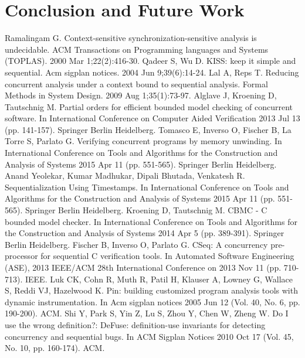 \documentclass{llncs}
\begin{document}
\section {Conclusion and Future Work}
\label{sect:conclusion}

\begin{thebibliography}{4}
%
Ramalingam G. Context-sensitive synchronization-sensitive analysis is undecidable. 
ACM Transactions on Programming languages and Systems (TOPLAS). 2000 Mar 1;22(2):416-30.
%
Qadeer S, Wu D. KISS: keep it simple and sequential. Acm sigplan notices. 2004 Jun 9;39(6):14-24.
%
Lal A, Reps T. Reducing concurrent analysis under a context bound to sequential analysis. 
Formal Methods in System Design. 2009 Aug 1;35(1):73-97.
%
Alglave J, Kroening D, Tautschnig M. 
Partial orders for efficient bounded model checking of concurrent software. 
In International Conference on Computer Aided Verification 2013 Jul 13 (pp. 141-157). 
Springer Berlin Heidelberg.
%
Tomasco E, Inverso O, Fischer B, La Torre S, Parlato G. 
Verifying concurrent programs by memory unwinding. 
In International Conference on Tools and Algorithms for the Construction and Analysis of 
Systems 2015 Apr 11 (pp. 551-565). Springer Berlin Heidelberg.
%
Anand Yeolekar, Kumar Madhukar, Dipali Bhutada, Venkatesh R.
Sequentialization Using Timestamps.
In International Conference on Tools and Algorithms for the Construction and Analysis of 
Systems 2015 Apr 11 (pp. 551-565). Springer Berlin Heidelberg.
%
Kroening D, Tautschnig M. 
CBMC - C bounded model checker. 
In International Conference on Tools and Algorithms for the Construction and Analysis of Systems 2014 Apr 5 (pp. 389-391). Springer Berlin Heidelberg.
%
Fischer B, Inverso O, Parlato G. 
CSeq: A concurrency pre-processor for sequential C verification tools. 
In Automated Software Engineering (ASE), 2013 IEEE/ACM 28th International Conference on 2013 Nov 11 (pp. 710-713). IEEE.
%
Luk CK, Cohn R, Muth R, Patil H, Klauser A, Lowney G, Wallace S, Reddi VJ, Hazelwood K. 
Pin: building customized program analysis tools with dynamic instrumentation. 
In Acm sigplan notices 2005 Jun 12 (Vol. 40, No. 6, pp. 190-200). ACM.
%
Shi Y, Park S, Yin Z, Lu S, Zhou Y, Chen W, Zheng W. 
Do I use the wrong definition?: DeFuse: definition-use invariants for detecting concurrency and sequential bugs. 
In ACM Sigplan Notices 2010 Oct 17 (Vol. 45, No. 10, pp. 160-174). ACM.
%
\end{thebibliography}
\end{document}
